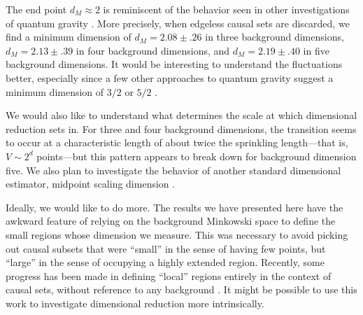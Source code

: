 \documentclass[12pt]{article}
\begin{document}
The end point $d_M\approx 2$ is reminiscent of the behavior seen in other
investigations of quantum gravity \cite{Carlipy}.  More precisely, when edgeless causal
sets are discarded, we find a minimum dimension of $d_M = 2.08 \pm .26$ in three
background dimensions, $d_M = 2.13 \pm .39$ in four background dimensions, and
$d_M = 2.19 \pm .40$ in five background  dimensions.  It would be interesting to
understand the fluctuations better, especially since a few other approaches to
quantum gravity suggest a minimum dimension of $3/2$ \cite{Coumbe,Laiho}
or $5/2$ \cite{Husain,Ronco}.

We would also like to understand what determines the scale at which dimensional
reduction sets in.  For three and four background dimensions, the transition seems to
occur at a characteristic length of about twice the sprinkling length---that is,
$V\sim 2^d$ points---but this pattern appears to break down for background
 dimension five.  We also plan to investigate the behavior of another standard
dimensional estimator, midpoint scaling dimension \cite{Reid}.

Ideally, we would like to do more.  The results we have presented here have the
awkward feature of relying on the background Minkowski space to define the
small regions whose dimension we measure.  This was necessary to avoid picking
out causal subsets that were ``small'' in the sense of having few points, but
``large'' in the sense of occupying a highly extended region.  Recently, some
progress has been made in defining ``local'' regions entirely in the context of
causal sets, without reference to any background \cite{Glaser}.  It might be
possible to use this work to investigate dimensional reduction more intrinsically.
\end{document}

